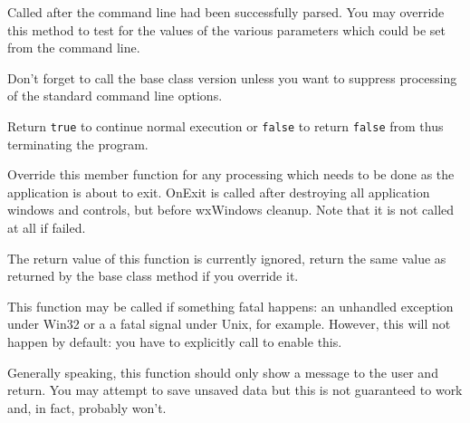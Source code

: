 


\label{wxapponcmdlineparsed}


Called after the command line had been successfully parsed. You may override
this method to test for the values of the various parameters which could be
set from the command line.

Don't forget to call the base class version unless you want to suppress
processing of the standard command line options.

Return {\tt true} to continue normal execution or {\tt false} to return 
{\tt false} from  thus terminating the program.




\label{wxapponexit}


Override this member function for any processing which needs to be
done as the application is about to exit. OnExit is called after
destroying all application windows and controls, but before
wxWindows cleanup. Note that it is not called at all if 
 failed.

The return value of this function is currently ignored, return the same value
as returned by the base class method if you override it.


\label{wxapponfatalexception}


This function may be called if something fatal happens: an unhandled
exception under Win32 or a a fatal signal under Unix, for example. However,
this will not happen by default: you have to explicitly call 
 to enable this.

Generally speaking, this function should only show a message to the user and
return. You may attempt to save unsaved data but this is not guaranteed to
work and, in fact, probably won't.



